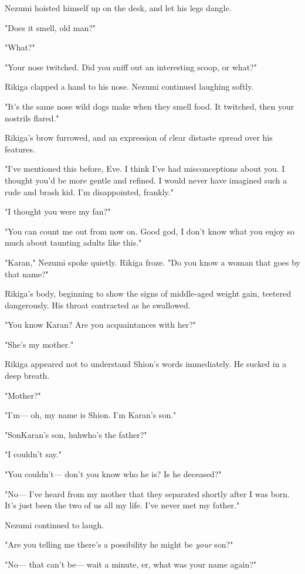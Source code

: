 Nezumi hoisted himself up on the desk, and let his legs dangle.

"Does it smell, old man?"

"What?"

"Your nose twitched. Did you sniff out an interesting scoop, or what?"

Rikiga clapped a hand to his nose. Nezumi continued laughing softly.

"It's the same nose wild dogs make when they smell food. It twitched,
then your nostrils flared."

Rikiga's brow furrowed, and an expression of clear distaste spread over
his features.

"I've mentioned this before, Eve. I think I've had misconceptions about
you. I thought you'd be more gentle and refined. I would never have
imagined such a rude and brash kid. I'm disappointed, frankly."

"I thought you were my fan?"

"You can count me out from now on. Good god, I don't know what you enjoy
so much about taunting adults like this."

"Karan," Nezumi spoke quietly. Rikiga froze. "Do you know a woman that
goes by that name?"

Rikiga's body, beginning to show the signs of middle-aged weight gain,
teetered dangerously. His throat contracted as he swallowed.

"You know Karan\el ? Are you acquaintances with her?"

"She's my mother."

Rikiga appeared not to understand Shion's words immediately. He sucked
in a deep breath.

"Mother?"

"I'm--- oh, my name is Shion. I'm Karan's son."

"Son\el Karan's son, huh\el who's the father?"

"I couldn't say."

"You couldn't--- don't you know who he is? Is he deceased?"

"No--- I've heard from my mother that they separated shortly after I was
born. It's just been the two of us all my life. I've never met my
father."

Nezumi continued to laugh.

"Are you telling me there's a possibility he might be \emph{your} son?"

"No--- that can't be--- wait a minute, er, what was your name again?"


